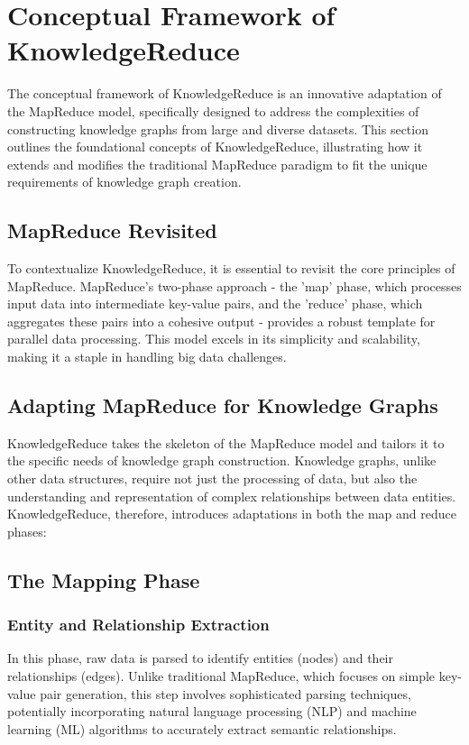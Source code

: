 \documentclass{article}
\begin{document}
\section{Conceptual Framework of KnowledgeReduce}
The conceptual framework of KnowledgeReduce is an innovative adaptation of the MapReduce model, specifically designed to address the complexities of constructing knowledge graphs from large and diverse datasets. This section outlines the foundational concepts of KnowledgeReduce, illustrating how it extends and modifies the traditional MapReduce paradigm to fit the unique requirements of knowledge graph creation.

\subsection{MapReduce Revisited}
To contextualize KnowledgeReduce, it is essential to revisit the core principles of MapReduce. MapReduce's two-phase approach - the 'map' phase, which processes input data into intermediate key-value pairs, and the 'reduce' phase, which aggregates these pairs into a cohesive output - provides a robust template for parallel data processing. This model excels in its simplicity and scalability, making it a staple in handling big data challenges.

\subsection{Adapting MapReduce for Knowledge Graphs}
KnowledgeReduce takes the skeleton of the MapReduce model and tailors it to the specific needs of knowledge graph construction. Knowledge graphs, unlike other data structures, require not just the processing of data, but also the understanding and representation of complex relationships between data entities. KnowledgeReduce, therefore, introduces adaptations in both the map and reduce phases:

\subsection{The Mapping Phase}
\subsubsection{Entity and Relationship Extraction} 
In this phase, raw data is parsed to identify entities (nodes) and their relationships (edges). Unlike traditional MapReduce, which focuses on simple key-value pair generation, this step involves sophisticated parsing techniques, potentially incorporating natural language processing (NLP) and machine learning (ML) algorithms to accurately extract semantic relationships.
\end{document}
